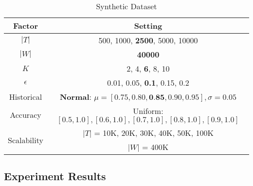 \begin{table}
	\centering
	\caption{Synthetic Dataset}
	\vspace{-1ex}
	\label{table:dataset-syn}
	\begin{tabular}{|c|c|}
		\hline
		Factor & Setting\\
		\hline
		$|T|$ & 500, 1000, \textbf{2500}, 5000, 10000\\
		\hline
		$|W|$ & 	\textbf{40000}		\\
		\hline
		$K$ & 2, 4, \textbf{6}, 8, 10\\
		\hline
		$\epsilon$ & 0.01, 0.05, \textbf{0.1}, 0.15, 0.2\\
		\hline
		{Historical} & \textbf{Normal}: $\mu = [0.75,  0.80, \textbf{0.85}, 0.90, 0.95], \sigma=0.05$	\\
		{Accuracy} &Uniform: $[0.5, 1.0], [0.6, 1.0], [0.7, 1.0], [0.8, 1.0], [0.9, 1.0]$ \\
		\hline
		\multirow{2}{*}{Scalability} & $|T|$ = 10K, 20K, 30K, 40K, 50K, 100K \\ & $|W|$ = 400K\\
		\hline
	\end{tabular}
\end{table}

\subsection{Experiment Results}

